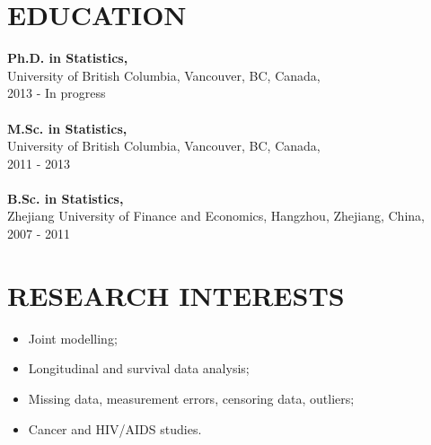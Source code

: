 \documentclass[margin]{res}
\begin{document}
\begin{resume}
 


\section{EDUCATION} {\bf Ph.D. in Statistics,} \\
                University of British Columbia, Vancouver, BC, Canada, \\ 
                2013 - In progress \\
                \\
				{\bf M.Sc. in Statistics,} \\
                University of British Columbia, Vancouver, BC, Canada, \\
                2011 - 2013 \\
                \\
				{\bf B.Sc. in Statistics,} \\
                Zhejiang University of Finance and Economics, Hangzhou, Zhejiang, China, \\
                2007 - 2011 \\

\section{RESEARCH INTERESTS} 
\begin{itemize}
    \item Joint modelling;
    \item Longitudinal and survival data analysis;
    \item Missing data, measurement errors, censoring data, outliers;
    \item Cancer and HIV/AIDS studies.
\end{itemize}
			
 


\end{resume}
\end{document}
